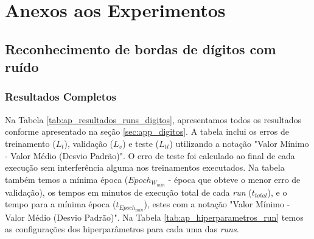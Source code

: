 
\chapter{Anexos aos Experimentos}
\label{ap:results}

\section{Reconhecimento de bordas de dígitos com ruído}
\label{apsec:reslts_digits}

\subsection{Resultados Completos}

Na Tabela \ref{tab:ap_resultados_runs_digitos}, apresentamos todos os resultados conforme apresentado na seção \ref{sec:app_digitos}. A tabela inclui os erros de treinamento ($L_{t}$), validação ($L_{v}$) e teste ($L_{tt}$) utilizando a notação "Valor Mínimo - Valor Médio (Desvio Padrão)". O erro de teste foi calculado ao final de cada execução sem interferência alguma nos treinamentos executados. Na tabela também temos a mínima época ($Epoch_{W_{min}}$ - época que obteve o menor erro de validação), os tempos em minutos de execução total de cada \textit{run} ($t_{total}$),  e o tempo para a mínima época ($t_{Epoch_{min}}$), estes com a notação "Valor Mínimo - Valor Médio (Desvio Padrão)". Na Tabela \ref{tab:ap_hiperparametros_run} temos as configurações dos hiperparâmetros para cada uma das \textit{runs}. 

